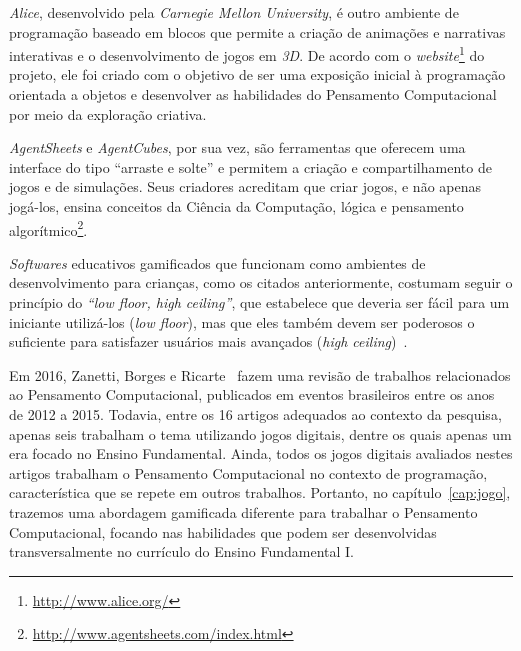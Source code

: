 \textit{Alice}, desenvolvido pela  \textit{Carnegie Mellon University}, é outro ambiente de programação baseado em blocos que permite a criação de animações e narrativas interativas e o desenvolvimento de jogos em \textit{3D}. De acordo com o \textit{website}\footnote{\url{http://www.alice.org/}} do projeto, ele foi criado com o objetivo de ser uma exposição inicial à programação orientada a objetos e desenvolver as habilidades do Pensamento Computacional por meio da exploração criativa. 

\textit{AgentSheets} e \textit{AgentCubes}, por sua vez, são ferramentas que oferecem uma interface do tipo “arraste e solte” e permitem a criação e compartilhamento de jogos e de simulações. Seus criadores acreditam que criar jogos, e não apenas jogá-los, ensina conceitos da Ciência da Computação, lógica e pensamento algorítmico\footnote{\url{http://www.agentsheets.com/index.html}}. 

\textit{Softwares} educativos gamificados que funcionam como ambientes de desenvolvimento para crianças, como os citados anteriormente, costumam seguir o princípio do \textit{“low floor, high ceiling”}, que estabelece que deveria ser fácil para um iniciante utilizá-los (\textit{low floor}), mas que eles também devem ser poderosos o suficiente para satisfazer usuários mais avançados (\textit{high ceiling})~\cite{grover_computational_2013}.

Em 2016, Zanetti, Borges e Ricarte~\cite{zanetti_pensamento_2016} fazem uma revisão de trabalhos relacionados ao Pensamento Computacional, publicados em eventos brasileiros entre os anos de 2012 a 2015. Todavia, entre os 16 artigos adequados ao contexto da pesquisa, apenas seis trabalham o tema utilizando jogos digitais, dentre os quais apenas um era focado no Ensino Fundamental. Ainda, todos os jogos digitais avaliados nestes artigos trabalham o Pensamento Computacional no contexto de programação, característica que se repete em outros trabalhos. Portanto, no capítulo~\ref{cap:jogo}, trazemos uma abordagem gamificada diferente para trabalhar o Pensamento Computacional, focando nas habilidades que podem ser desenvolvidas transversalmente no currículo do Ensino Fundamental I.
